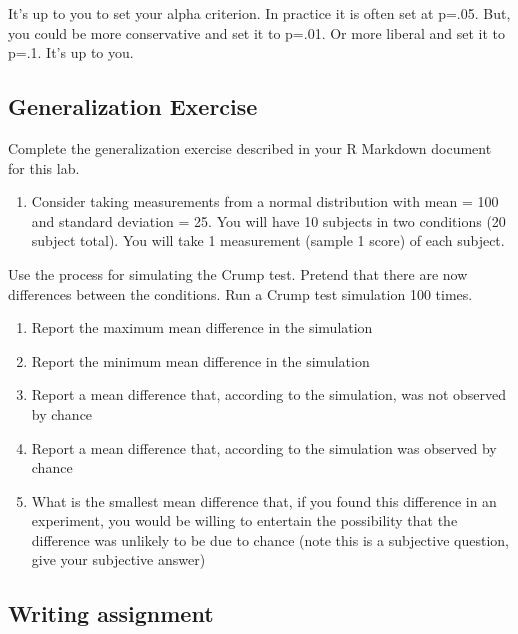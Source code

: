 \documentclass[
]{book}
\providecommand{\tightlist}{%
  \setlength{\itemsep}{0pt}\setlength{\parskip}{0pt}}
\begin{document}
It's up to you to set your alpha criterion. In practice it is often set at p=.05. But, you could be more conservative and set it to p=.01. Or more liberal and set it to p=.1. It's up to you.

\hypertarget{generalization-exercise-4}{%
\subsection{Generalization Exercise}\label{generalization-exercise-4}}

Complete the generalization exercise described in your R Markdown document for this lab.

\begin{enumerate}
\def\labelenumi{\arabic{enumi}.}
\tightlist
\item
  Consider taking measurements from a normal distribution with mean = 100 and standard deviation = 25. You will have 10 subjects in two conditions (20 subject total). You will take 1 measurement (sample 1 score) of each subject.
\end{enumerate}

Use the process for simulating the Crump test. Pretend that there are now differences between the conditions. Run a Crump test simulation 100 times.

\begin{enumerate}
\def\labelenumi{\alph{enumi}.}
\tightlist
\item
  Report the maximum mean difference in the simulation
\item
  Report the minimum mean difference in the simulation
\item
  Report a mean difference that, according to the simulation, was not observed by chance
\item
  Report a mean difference that, according to the simulation was observed by chance
\item
  What is the smallest mean difference that, if you found this difference in an experiment, you would be willing to entertain the possibility that the difference was unlikely to be due to chance (note this is a subjective question, give your subjective answer)
\end{enumerate}

\hypertarget{writing-assignment-4}{%
\subsection{Writing assignment}\label{writing-assignment-4}}
\end{document}
